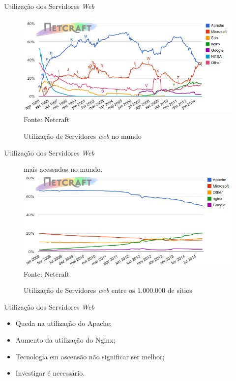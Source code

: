 \begin{frame}{Utilização dos Servidores \textit{Web}}
	\begin{figure}
		\centering
		\caption{Utilização de Servidores \textit{web} no mundo}
		\includegraphics[width=1\linewidth]{../figuras/grafico1}\\
		Fonte: Netcraft
	\end{figure}
\end{frame}
\begin{frame}{Utilização dos Servidores \textit{Web}}
	\begin{figure}
		\centering
		\caption{Utilização de Servidores \textit{web} entre os 1.000.000 de 
		sítios 
		}
		mais acessados no mundo.
		\includegraphics[width=1\linewidth]{../figuras/grafico2} \\
		Fonte: Netcraft
	\end{figure}
\end{frame}
\begin{frame}{Utilização dos Servidores \textit{Web}}
	\begin{itemize}
		\item Queda na utilização do Apache; \pause
		\item Aumento da utilização do Nginx; \pause
		\item Tecnologia em ascensão não significar ser melhor; \pause
		\item Investigar é necessário.
	\end{itemize}
\end{frame}


